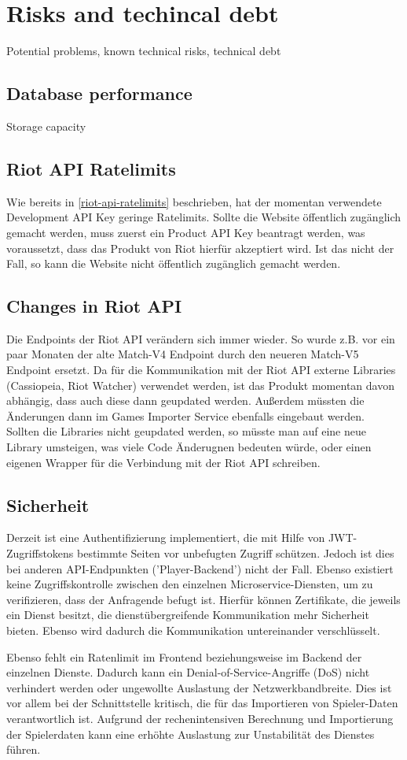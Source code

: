 \section{Risks and techincal debt}
Potential problems, known technical risks, technical debt

\subsection{Database performance}
Storage capacity

\subsection{Riot API Ratelimits}
Wie bereits in \ref{riot-api-ratelimits} beschrieben, hat der momentan verwendete Development API Key geringe Ratelimits. Sollte die Website öffentlich zugänglich gemacht werden, muss zuerst ein Product API Key beantragt werden, was voraussetzt, dass das Produkt von Riot hierfür akzeptiert wird. Ist das nicht der Fall, so kann die Website nicht öffentlich zugänglich gemacht werden.

\subsection{Changes in Riot API}
Die Endpoints der Riot API verändern sich immer wieder. So wurde z.B. vor ein paar Monaten der alte Match-V4 Endpoint durch den neueren Match-V5 Endpoint ersetzt. Da für die Kommunikation mit der Riot API externe Libraries (Cassiopeia, Riot Watcher) verwendet werden, ist das Produkt momentan davon abhängig, dass auch diese dann geupdated werden.
Außerdem müssten die Änderungen dann im Games Importer Service ebenfalls eingebaut werden.\\ Sollten die Libraries nicht geupdated werden, so müsste man auf eine neue Library umsteigen, was viele Code Änderugnen bedeuten würde, oder einen eigenen Wrapper für die Verbindung mit der Riot API schreiben.

\subsection{Sicherheit}

Derzeit ist eine Authentifizierung implementiert, die mit Hilfe von JWT-Zugriffstokens bestimmte Seiten vor unbefugten Zugriff schützen.
Jedoch ist dies bei anderen API-Endpunkten ('Player-Backend') nicht der Fall. Ebenso existiert keine Zugriffskontrolle zwischen den
einzelnen Microservice-Diensten, um zu verifizieren, dass der Anfragende befugt ist. Hierfür können Zertifikate, die jeweils ein
Dienst besitzt, die dienstübergreifende Kommunikation mehr Sicherheit bieten. Ebenso wird dadurch die Kommunikation untereinander
verschlüsselt.

Ebenso fehlt ein Ratenlimit im Frontend beziehungsweise im Backend der einzelnen Dienste. Dadurch kann ein Denial-of-Service-Angriffe (DoS)
nicht verhindert werden oder ungewollte Auslastung der Netzwerkbandbreite. Dies ist vor allem bei der Schnittstelle kritisch, die für das 
Importieren von Spieler-Daten verantwortlich ist. Aufgrund der rechenintensiven Berechnung und Importierung der Spielerdaten kann 
eine erhöhte Auslastung zur Unstabilität des Dienstes führen.